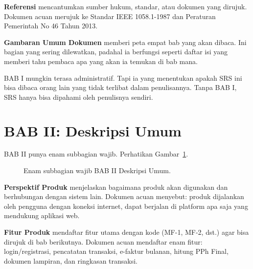 \documentclass[11pt,a4paper]{article}
\begin{document}
\textbf{Referensi} mencantumkan sumber hukum, standar, atau dokumen yang dirujuk. Dokumen acuan merujuk ke Standar IEEE 1058.1-1987 dan Peraturan Pemerintah No 46 Tahun 2013.

\textbf{Gambaran Umum Dokumen} memberi peta empat bab yang akan dibaca. Ini bagian yang sering dilewatkan, padahal ia berfungsi seperti daftar isi yang memberi tahu pembaca apa yang akan ia temukan di bab mana.

BAB I mungkin terasa administratif. Tapi ia yang menentukan apakah SRS ini bisa dibaca orang lain yang tidak terlibat dalam penulisannya. Tanpa BAB I, SRS hanya bisa dipahami oleh penulisnya sendiri.

\section{BAB II: Deskripsi Umum}

BAB II punya enam subbagian wajib. Perhatikan Gambar~\ref{fig:bab-two}.

\begin{figure}[H]
	\centering
	\caption{Enam subbagian wajib BAB II Deskripsi Umum.}
	\label{fig:bab-two}
\end{figure}

\textbf{Perspektif Produk} menjelaskan bagaimana produk akan digunakan dan berhubungan dengan sistem lain. Dokumen acuan menyebut: produk dijalankan oleh pengguna dengan koneksi internet, dapat berjalan di platform apa saja yang mendukung aplikasi web.

\textbf{Fitur Produk} mendaftar fitur utama dengan kode (MF-1, MF-2, dst.) agar bisa dirujuk di bab berikutnya. Dokumen acuan mendaftar enam fitur: login/registrasi, pencatatan transaksi, e-faktur bulanan, hitung PPh Final, dokumen lampiran, dan ringkasan transaksi.
\end{document}
